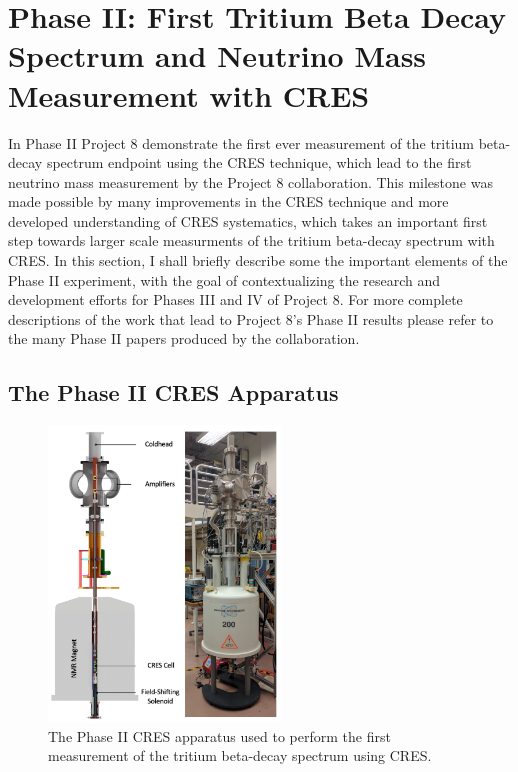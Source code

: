 \cleardoublepage


\section{Phase II: First Tritium Beta Decay Spectrum and Neutrino Mass Measurement with CRES}

In Phase II Project 8 demonstrate the first ever measurement of the tritium beta-decay spectrum endpoint using the CRES technique, which lead to the first neutrino mass measurement by the Project 8 collaboration. This milestone was made possible by many improvements in the CRES technique and more developed understanding of CRES systematics, which takes an important first step towards larger scale measurments of the tritium beta-decay spectrum with CRES. In this section, I shall briefly describe some the important elements of the Phase II experiment, with the goal of contextualizing the research and development efforts for Phases III and IV of Project 8. For more complete descriptions of the work that lead to Project 8's Phase II results please refer to the many Phase II papers produced by the collaboration.

\subsection{The Phase II CRES Apparatus}

\begin{figure}[htbp]
    \centering
    \includegraphics[width=0.55\textwidth]{figs/Chapter-3/phaseII_system.png}
    \caption{\label{fig:chap3-phase2-apparatus} The Phase II CRES apparatus used to perform the first measurement of the tritium beta-decay spectrum using CRES.}
\end{figure}

